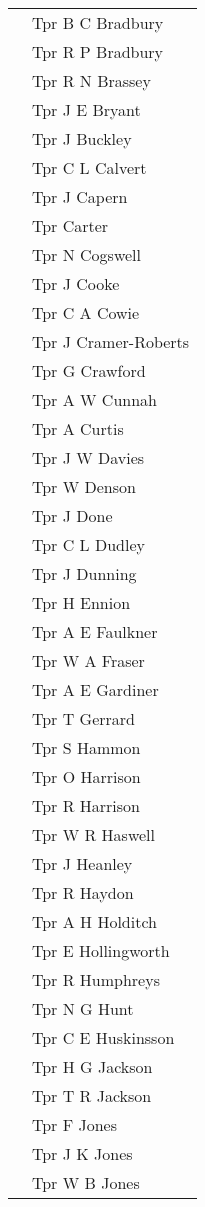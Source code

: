 \begin{center}
\begin{tabular}{rl}
    & Tpr B C Bradbury \\
    & Tpr R P Bradbury \\
    & Tpr R N Brassey \\
    & Tpr J E Bryant \\
    & Tpr J Buckley \\
    & Tpr C L Calvert \\
    & Tpr J Capern \\
    & Tpr Carter \\
    & Tpr N Cogswell \\
    & Tpr J Cooke \\
    & Tpr C A Cowie \\
    & Tpr J Cramer-Roberts \\
    & Tpr G Crawford \\
    & Tpr A W Cunnah \\
    & Tpr A Curtis \\
    & Tpr J W Davies \\
    & Tpr W Denson \\
    & Tpr J Done \\
    & Tpr C L Dudley \\
    & Tpr J Dunning \\
    & Tpr H Ennion \\
    & Tpr A E Faulkner \\
    & Tpr W A Fraser \\
    & Tpr A E Gardiner \\
    & Tpr T Gerrard \\
    & Tpr S Hammon \\
    & Tpr O Harrison \\
    & Tpr R Harrison \\
    & Tpr W R Haswell \\
    & Tpr J Heanley \\
    & Tpr R Haydon \\
    & Tpr A H Holditch \\
    & Tpr E Hollingworth \\
    & Tpr R Humphreys \\
    & Tpr N G Hunt \\
    & Tpr C E Huskinsson \\
    & Tpr H G Jackson \\
    & Tpr T R Jackson \\
    & Tpr F Jones \\
    & Tpr J K Jones \\
    & Tpr W B Jones \\

\end{tabular}
\end{center}
